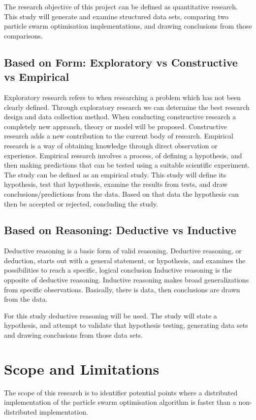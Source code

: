 \documentclass[oneside,12pt]{book}
\begin{document}
The research objective of this project can be defined as quantitative research. This study will generate and examine structured data sets, comparing two particle swarm optimisation implementations, and drawing conclusions from those comparisons. 
\subsection{Based on Form: Exploratory vs Constructive vs Empirical}
Exploratory research refers to when researching a problem which has not been clearly defined. Through exploratory research we can determine the best research design and data collection method. 
When conducting constructive research a completely new approach, theory or model will be proposed. Constructive research adds a new contribution to the current body of research. 
Empirical research is a way of obtaining knowledge through direct observation or experience. Empirical research involves a process, of defining a hypothesis, and then making predictions that can be tested using a suitable scientific experiment. The study can be defined as an empirical study. This study will define its hypothesis, test that hypothesis, examine the results from tests, and draw conclusions/predictions from the data. Based on that data the hypothesis can then be accepted or rejected, concluding the study.  

\subsection{Based on Reasoning: Deductive vs Inductive}
Deductive reasoning is a basic form of valid reasoning. Deductive reasoning, or deduction, starts out with a general statement, or hypothesis, and examines the possibilities to reach a specific, logical conclusion
Inductive reasoning is the opposite of deductive reasoning. Inductive reasoning makes broad generalizations from specific observations. Basically, there is data, then conclusions are drawn from the data. 

For this study deductive reasoning will be used. The study will state a hypothesis, and attempt to validate that hypothesis testing, generating data sets and drawing conclusions from those data sets. 

\section{Scope and Limitations}
The scope of this research is to identifier potential points where a distributed implementation of the particle swarm optimisation algorithm is faster than a non-distributed implementation. 
\end{document}
